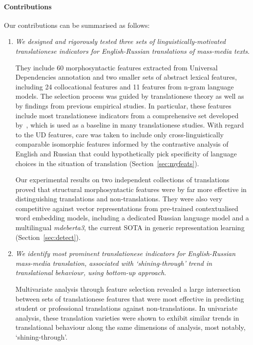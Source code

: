 \paragraph{Contributions}
Our contributions can be summarised as follows: %
\begin{enumerate}\compresslist{}
	\item \textit{We designed and rigorously tested three sets of linguistically-motivated translationese indicators for English-Russian translations of mass-media texts}. 
	
	They include 60 morphosyntactic features extracted from Universal Dependencies annotation and two smaller sets of abstract lexical features, including 24 collocational features and 11 features from n-gram language models. The selection process was guided by translationese theory as well as by findings from previous empirical studies. In particular, these features include most translationese indicators from a comprehensive set developed by~\citet{Volansky2015}, which is used as a baseline in many translationese studies. With regard to the UD features, care was taken to include only cross-linguistically comparable isomorphic features informed by the contrastive analysis of English and Russian that could hypothetically pick specificity of language choices in the situation of translation (Section~\ref{sec:myfeats}). 
	
	Our experimental results on two independent collections of translations proved that structural morphosyntactic features were by far more effective in distinguishing translations and non-translations. They were also very competitive against vector representations from pre-trained contextualised word embedding models, including a dedicated Russian language model and a multilingual \textit{mdeberta3}, the current SOTA in generic representation learning (Section~\ref{sec:detect}).      
	
	\item \textit{We identify most prominent translationese indicators for English-Russian mass-media translation, associated with `shining-through' trend in translational behaviour, using bottom-up approach}. 
	
	Multivariate analysis through feature selection revealed a large intersection between sets of translationese features that were most effective in predicting student or professional translations against non-translations. In univariate analysis, these translation varieties were shown to exhibit similar trends in translational behaviour along the same dimensions of analysis, most notably, `shining-through'.
	

\end{enumerate}
